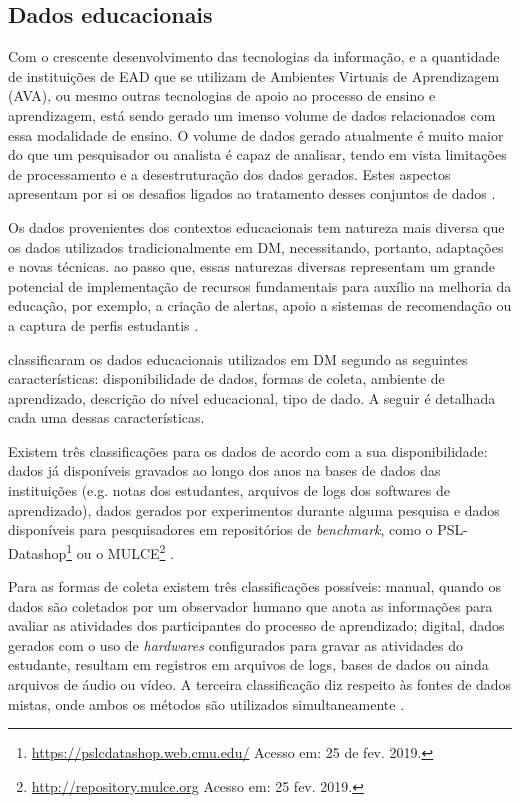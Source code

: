 \subsection{Dados educacionais}

Com o crescente desenvolvimento das tecnologias da informação, e a quantidade de
instituições de EAD que se utilizam de Ambientes Virtuais de Aprendizagem (AVA),
ou mesmo outras tecnologias de apoio ao processo de ensino e aprendizagem, está
sendo gerado um imenso volume de dados relacionados com essa modalidade de
ensino. O volume de dados gerado atualmente é muito maior do que um pesquisador
ou analista  é capaz de analisar, tendo em vista limitações de processamento e a
desestruturação dos dados gerados. Estes aspectos apresentam por si os desafios
ligados ao tratamento desses conjuntos de dados
\cite{rigo2014aplicaccoes,costa2012mineraccao}.

Os dados provenientes dos contextos educacionais tem natureza mais diversa que
os dados utilizados tradicionalmente em DM, necessitando, portanto, adaptações e
novas técnicas. ao passo que, essas naturezas diversas representam um grande
potencial de implementação de recursos fundamentais para auxílio na melhoria da
educação, por exemplo, a criação de alertas, apoio a sistemas de recomendação ou
a captura de perfis estudantis \cite{rigo2014aplicaccoes}.

 classificaram os dados educacionais
utilizados em DM segundo as seguintes características: disponibilidade de dados,
formas de coleta, ambiente de aprendizado, descrição do nível educacional, tipo
de dado. A seguir é detalhada cada uma dessas características.

Existem três classificações para os dados de acordo com a sua disponibilidade:
dados já disponíveis gravados ao longo dos anos na bases de dados das
instituições (e.g. notas dos estudantes, arquivos de logs dos softwares de
aprendizado), dados gerados por experimentos durante alguma pesquisa e dados
disponíveis para pesquisadores em repositórios de \textit{benchmark}, como o
PSL-Datashop\footnote{\url{https://pslcdatashop.web.cmu.edu/} Acesso em: 25 de
fev. 2019.} ou o MULCE\footnote{\url{http://repository.mulce.org} Acesso em: 25
fev. 2019.} \cite{bousbia2014contribution}.

Para as formas de coleta existem três classificações possíveis: manual, quando
os dados são coletados por um observador humano que anota as informações para
avaliar as atividades dos participantes do processo de aprendizado; digital,
dados gerados com o uso de \textit{hardwares} configurados para gravar as
atividades do estudante, resultam em registros em arquivos de logs, bases de
dados ou ainda arquivos de áudio ou vídeo. A terceira classificação diz respeito
às fontes de dados mistas, onde ambos os métodos são utilizados simultaneamente
\cite{bousbia2014contribution}.

